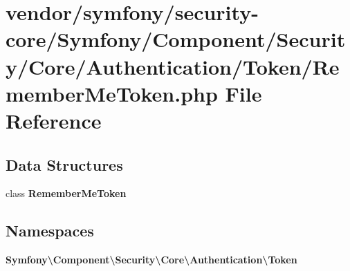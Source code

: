 \section{vendor/symfony/security-\/core/\+Symfony/\+Component/\+Security/\+Core/\+Authentication/\+Token/\+Remember\+Me\+Token.php File Reference}
\label{_remember_me_token_8php}
\subsection*{Data Structures}
\begin{DoxyCompactItemize}
\item 
class {\bf Remember\+Me\+Token}
\end{DoxyCompactItemize}
\subsection*{Namespaces}
\begin{DoxyCompactItemize}
\item 
 {\bf Symfony\textbackslash{}\+Component\textbackslash{}\+Security\textbackslash{}\+Core\textbackslash{}\+Authentication\textbackslash{}\+Token}
\end{DoxyCompactItemize}
